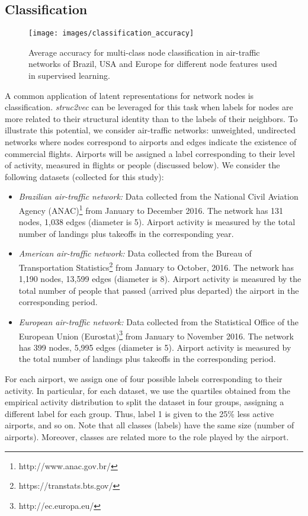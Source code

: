 \documentclass[sigconf]{acmart}
\begin{document}
 \subsection{Classification}
\label{multiclass}

\begin{figure}
\centering
\texttt{[image: images/classification\_accuracy]} 
\caption[]{Average accuracy for multi-class node classification in air-traffic networks of Brazil, USA and Europe for different node features used in supervised learning.}
\label{classification_accuracy}
\end{figure}

A common application of latent representations for network nodes is classification. \textit{struc2vec} can be leveraged for this task when labels for nodes are more related to their structural identity than to the labels of their neighbors. To illustrate this potential, we consider air-traffic networks: unweighted, undirected networks where nodes correspond to airports and edges indicate the existence of commercial flights. Airports will be assigned a label corresponding to their level of activity, measured in flights or people (discussed below). We consider the following datasets (collected for this study):

\begin{itemize}
    \item \emph{Brazilian air-traffic network:} Data collected from the National Civil Aviation Agency (ANAC)\footnote{http://www.anac.gov.br/} from January to December 2016. The network has 131 nodes, 1,038 edges (diameter is 5). Airport activity is measured by the total number of landings plus takeoffs in the corresponding year. 
    \item \emph{American air-traffic network:} Data collected from the Bureau of Transportation Statistics\footnote{https://transtats.bts.gov/} from January to October, 2016. The network has 1,190 nodes, 13,599 edges (diameter is 8). Airport activity is measured by the total number of people that passed (arrived plus departed) the airport in the corresponding period. 
    \item \emph{European air-traffic network:} Data collected from the Statistical Office of the European Union (Eurostat)\footnote{http://ec.europa.eu/} from January to November 2016. The network has 399 nodes, 5,995 edges (diameter is 5). Airport activity is measured by the total number of landings plus takeoffs in the corresponding period. 
\end{itemize}
For each airport, we assign one of four possible labels corresponding to their activity. In particular, for each dataset, we use the quartiles obtained from the empirical activity distribution to split the dataset in four groups, assigning a different label for each group. Thus, label 1 is given to the 25\% less active airports, and so on. Note that all classes (labels) have the same size (number of airports). Moreover, classes are related more to the role played by the airport. 
\end{document}
